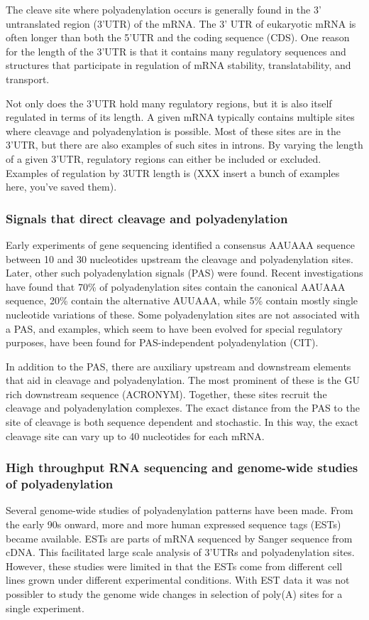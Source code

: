 The cleave site where polyadenylation occurs is generally found in the 3'
untranslated region (3'UTR) of the mRNA. The 3' UTR of eukaryotic mRNA is often
longer than both the 5'UTR and the coding sequence (CDS). One reason for the
length of the 3'UTR is that it contains many regulatory sequences and
structures that participate in regulation of mRNA stability, translatability,
and transport.

Not only does the 3'UTR hold many regulatory regions, but it is also itself
regulated in terms of its length. A given mRNA typically contains multiple
sites where cleavage and polyadenylation is possible. Most of these sites are
in the 3'UTR, but there are also examples of such sites in introns. By varying
the length of a given 3'UTR, regulatory regions can either be included or
excluded. Examples of regulation by 3UTR length is (XXX insert a bunch of
examples here, you've saved them).

\subsubsection{Signals that direct cleavage and polyadenylation}
Early experiments of gene sequencing identified a consensus AAUAAA sequence
between 10 and 30 nucleotides upstream the cleavage and polyadenylation sites.
Later, other such polyadenylation signals (PAS) were found. Recent
investigations have found that 70\% of polyadenylation sites contain the
canonical AAUAAA sequence, 20\% contain the alternative AUUAAA, while 5\%
contain mostly single nucleotide variations of these. Some polyadenylation
sites are not associated with a PAS, and examples, which seem to have been
evolved for special regulatory purposes, have been found for PAS-independent
polyadenylation (CIT).

In addition to the PAS, there are auxiliary upstream and downstream elements
that aid in cleavage and polyadenylation. The most prominent of these is the GU
rich downstream sequence (ACRONYM). Together, these sites recruit the cleavage
and polyadenylation complexes. The exact distance from the PAS to the site of
cleavage is both sequence dependent and stochastic. In this way, the exact
cleavage site can vary up to 40 nucleotides for each mRNA.

\subsubsection{High throughput RNA sequencing and genome-wide studies of
polyadenylation}
Several genome-wide studies of polyadenylation patterns have been made. From
the early 90s onward, more and more human expressed sequence tags (ESTs) became
available. ESTs are parts of mRNA sequenced by Sanger sequence from cDNA. This
facilitated large scale analysis of 3'UTRs and polyadenylation sites. However,
these studies were limited in that the ESTs come from different cell lines
grown under different experimental conditions. With EST data it was not
possibler to study the genome wide changes in selection of poly(A) sites for a
single experiment.

